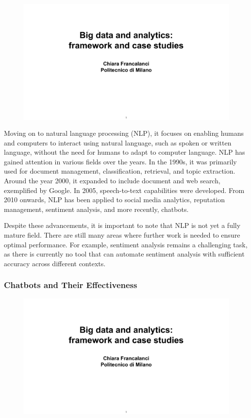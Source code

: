 \begin{figure}[!h]
  \centering
  \includegraphics[page=11, trim = 1.5cm 5cm 1.5cm 4cm, clip, width=\imagewidth]{images/06 - BIG_DATA.pdf}
\end{figure}

Moving on to natural language processing (NLP), it focuses on enabling
humans and computers to interact using natural language, such as spoken
or written language, without the need for humans to adapt to computer
language. NLP has gained attention in various fields over the years. In
the 1990s, it was primarily used for document management,
classification, retrieval, and topic extraction. Around the year 2000,
it expanded to include document and web search, exemplified by Google.
In 2005, speech-to-text capabilities were developed. From 2010 onwards,
NLP has been applied to social media analytics, reputation management,
sentiment analysis, and more recently, chatbots.

Despite these advancements, it is important to note that NLP is not yet
a fully mature field. There are still many areas where further work is
needed to ensure optimal performance. For example, sentiment analysis
remains a challenging task, as there is currently no tool that can
automate sentiment analysis with sufficient accuracy across different
contexts.


\subsubsection{Chatbots and Their
  Effectiveness}\label{chatbots-and-their-effectiveness}

\begin{figure}[!h]
  \centering
  \includegraphics[page=12, trim = 1.5cm 3.3cm 1.5cm 4cm, clip, width=\imagewidth]{images/06 - BIG_DATA.pdf}
\end{figure}

